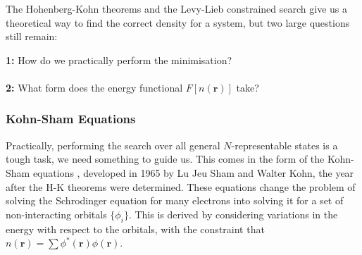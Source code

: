 \documentclass[12pt]{article}
\begin{document}
The Hohenberg-Kohn theorems and the Levy-Lieb constrained search give us a theoretical way to find the correct density for a system, but two large questions still remain: 
\begin{displayquote}
\textbf{1:} How do we practically perform the minimisation?
\\\\
\textbf{2:} What form does the energy functional $F[n(\mathbf r)]$ take?
\end{displayquote}
\subsubsection{Kohn-Sham Equations}
Practically, performing the search over all general $N$-representable states is a tough task, we need something to guide us. 
This comes in the form of the Kohn-Sham equations \cite{kohn1965self}, developed in 1965 by Lu Jeu Sham and Walter Kohn, the year after the H-K theorems were determined. 
These equations change the problem of solving the Schrodinger equation for many electrons into solving it for a set of non-interacting orbitals $\{\phi_i\}$. This is derived by considering variations in the energy with respect to the orbitals, with the constraint that $n(\mathbf r) = \sum \phi^*(\mathbf r)\phi(\mathbf r)$.
\end{document}
